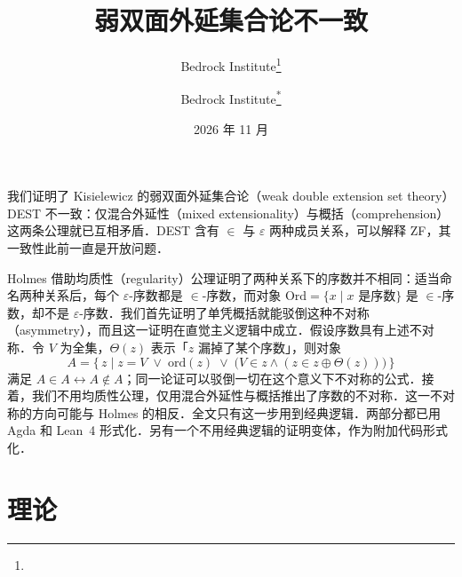 \documentclass{article}
\title{弱双面外延集合论不一致}
\author{Bedrock Institute\thanks{\authornote}}
\author{Bedrock Institute\hyperlink{titlenote}{\textsuperscript{*}}}
\date{2026 年 11 月}
\makeatletter
\providecommand{\kaishu}{\CJKfamily{zhkai}}
\newcommand{\authornote}{通讯作者：Peter Zhang，\href{mailto:peterzhangsg@gmail.com}{peterzhangsg@gmail.com}\newline
代码与形式证明：\href{https://github.com/BedrockInstitute/DESTInconsistency}{\texttt{github.com/BedrockInstitute/DESTInconsistency}}\newline
\textcopyright\ 2026 Bedrock Institute．以 CC BY-NC-SA 4.0 许可发布．}
\newcommand{\titlenote}[1]{}
\newcommand{\kaishu}{}
\renewcommand{\abstractname}{摘要}
\newcommand{\titlenote}[1]{\footnotetext[1]{\raisebox{\ht\strutbox}{\hypertarget{titlenote}{}}#1}\setcounter{footnote}{1}}
\renewenvironment{abstract}{\par\noindent{\bfseries\abstractname}\hspace{1em}\kaishu\ignorespaces}{\par}
\theoremstyle{zh}
\newcommand{\eps}{\varepsilon}
\newcommand{\ord}{\mathrm{ord}}
\newcommand{\Ord}{\mathrm{Ord}}
\newcommand{\DEST}{\textup{DEST}}
\makeatother
\begin{document}
\maketitle
\titlenote{\authornote}

\begin{abstract}
我们证明了 Kisielewicz 的弱双面外延集合论（weak double extension set theory）\DEST{} 不一致：仅混合外延性（mixed extensionality）与概括（comprehension）这两条公理就已互相矛盾．\DEST{} 含有 $\in$ 与 $\eps$ 两种成员关系，可以解释 ZF，其一致性此前一直是开放问题．

Holmes 借助均质性（regularity）公理证明了两种关系下的序数并不相同：适当命名两种关系后，每个 $\eps$-序数都是 $\in$-序数，而对象 $\Ord = \{x \mid x \text{ 是序数}\}$ 是 $\in$-序数，却不是 $\eps$-序数．我们首先证明了单凭概括就能驳倒这种不对称（asymmetry），而且这一证明在直觉主义逻辑中成立．假设序数具有上述不对称．令 $V$ 为全集，$\Theta(z)$ 表示「$z$ 漏掉了某个序数」，则对象
\[
  A = \{\, z \mid z = V \;\vee\; \ord(z) \;\vee\; \bigl(V \in z \wedge (z \in z \oplus \Theta(z))\bigr) \,\}
\]
满足 $A \in A \leftrightarrow A \notin A$；同一论证可以驳倒一切在这个意义下不对称的公式．接着，我们不用均质性公理，仅用混合外延性与概括推出了序数的不对称．这一不对称的方向可能与 Holmes 的相反．全文只有这一步用到经典逻辑．两部分都已用 Agda 和 Lean~4 形式化．另有一个不用经典逻辑的证明变体，作为附加代码形式化．
\end{abstract}

\section{理论}\label{sec:1}
\end{document}
